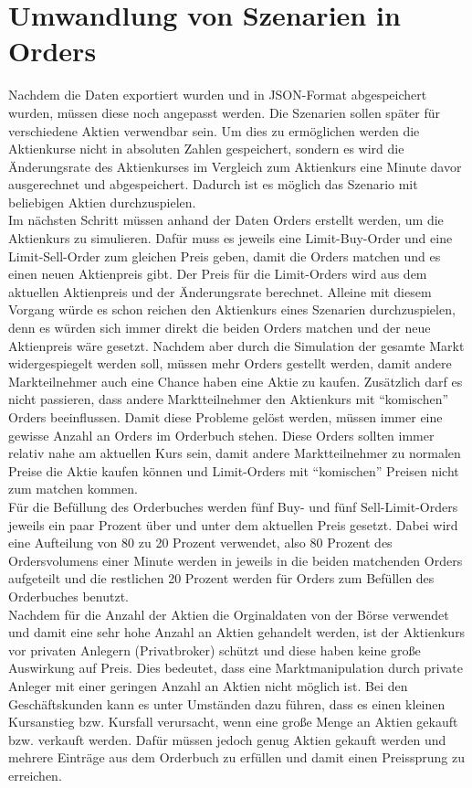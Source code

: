 \section{Umwandlung von Szenarien in Orders}
Nachdem die Daten exportiert wurden und in JSON-Format abgespeichert wurden, müssen diese noch angepasst werden. Die 
Szenarien sollen später für verschiedene Aktien verwendbar sein. Um dies zu ermöglichen werden die Aktienkurse nicht in 
absoluten Zahlen gespeichert, sondern es wird die Änderungsrate des Aktienkurses im Vergleich zum Aktienkurs eine Minute davor 
ausgerechnet und abgespeichert. Dadurch ist es möglich das Szenario mit beliebigen Aktien durchzuspielen. \\
Im nächsten Schritt müssen anhand der Daten Orders erstellt werden, um die Aktienkurs zu simulieren. Dafür muss es jeweils eine Limit-Buy-Order 
und eine Limit-Sell-Order zum gleichen Preis geben, damit die Orders matchen und es einen neuen Aktienpreis gibt. Der Preis für die 
Limit-Orders wird aus dem aktuellen Aktienpreis und der Änderungsrate berechnet. Alleine mit diesem Vorgang würde es schon reichen 
den Aktienkurs eines Szenarien durchzuspielen, denn es würden sich immer direkt die beiden Orders matchen und der neue Aktienpreis 
wäre gesetzt. Nachdem aber durch die Simulation der gesamte Markt widergespiegelt werden soll, müssen mehr Orders gestellt werden, damit 
andere Markteilnehmer auch eine Chance haben eine Aktie zu kaufen. Zusätzlich darf es nicht passieren, dass andere Marktteilnehmer 
den Aktienkurs mit \enquote{komischen} Orders beeinflussen. Damit diese Probleme gelöst werden, müssen immer eine gewisse Anzahl an Orders 
im Orderbuch stehen. Diese Orders sollten immer relativ nahe am aktuellen Kurs sein, damit andere Marktteilnehmer zu normalen Preise die 
Aktie kaufen können und Limit-Orders mit \enquote{komischen} Preisen nicht zum matchen kommen. \\
Für die Befüllung des Orderbuches werden fünf Buy- und fünf Sell-Limit-Orders jeweils ein paar Prozent über und unter dem aktuellen 
Preis gesetzt. Dabei wird eine Aufteilung von 80 zu 20 Prozent verwendet, also 80 Prozent des Ordersvolumens einer Minute werden in jeweils 
in die beiden matchenden Orders aufgeteilt und die restlichen 20 Prozent werden für Orders zum Befüllen des Orderbuches benutzt.\\
Nachdem für die Anzahl der Aktien die Orginaldaten von der Börse verwendet und damit eine sehr hohe Anzahl an Aktien gehandelt werden, ist der Aktienkurs vor 
privaten Anlegern (Privatbroker) schützt und diese haben keine große Auswirkung auf Preis. Dies bedeutet, dass eine Marktmanipulation durch private Anleger mit 
einer geringen Anzahl an Aktien nicht möglich ist. Bei den Geschäftskunden kann es unter Umständen dazu führen, dass es einen kleinen Kursanstieg bzw. Kursfall 
verursacht, wenn eine große Menge an Aktien gekauft bzw. verkauft werden. Dafür müssen jedoch genug Aktien gekauft werden und mehrere Einträge aus dem Orderbuch 
zu erfüllen und damit einen Preissprung zu erreichen.
